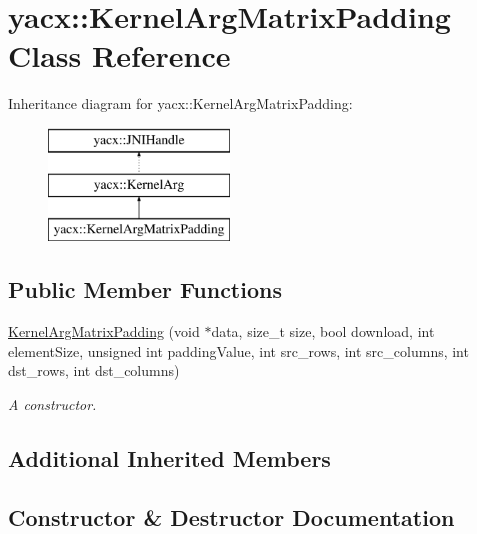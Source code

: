 \hypertarget{classyacx_1_1_kernel_arg_matrix_padding}{}\section{yacx\+:\+:Kernel\+Arg\+Matrix\+Padding Class Reference}
\label{classyacx_1_1_kernel_arg_matrix_padding}
Inheritance diagram for yacx\+:\+:Kernel\+Arg\+Matrix\+Padding\+:\begin{figure}[H]
\begin{center}
\leavevmode
\includegraphics[height=3.000000cm]{classyacx_1_1_kernel_arg_matrix_padding}
\end{center}
\end{figure}
\subsection*{Public Member Functions}
\begin{DoxyCompactItemize}
\item 
\hyperlink{classyacx_1_1_kernel_arg_matrix_padding_ae1deb41319073ffa43589668baa7de63}{Kernel\+Arg\+Matrix\+Padding} (void $\ast$data, size\+\_\+t size, bool download, int element\+Size, unsigned int padding\+Value, int src\+\_\+rows, int src\+\_\+columns, int dst\+\_\+rows, int dst\+\_\+columns)
\begin{DoxyCompactList}\small\item\em A constructor. \end{DoxyCompactList}\end{DoxyCompactItemize}
\subsection*{Additional Inherited Members}


\subsection{Constructor \& Destructor Documentation}
\mbox{\label{classyacx_1_1_kernel_arg_matrix_padding_ae1deb41319073ffa43589668baa7de63}} 
